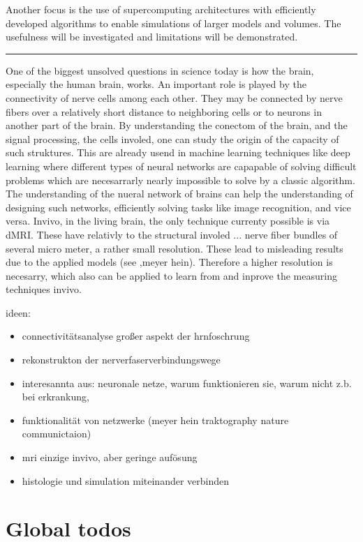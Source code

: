Another focus is the use of supercomputing architectures with efficiently developed algorithms to enable simulations of larger models and volumes.
The usefulness will be investigated and limitations will be demonstrated.
\par
% 
\par
\noindent\rule{\textwidth}{2pt}
\par
% 
One of the biggest unsolved questions in science today is how the brain, especially the human brain, works.
An important role is played by the connectivity of nerve cells among each other.
They may be connected by nerve fibers over a relatively short distance to neighboring cells or to neurons in another part of the brain.
By understanding the conectom of the brain, and the signal processing, \ie{} the cells involed, one can study the origin of the capacity of such struktures.
This are already usend in machine learning techniques like deep learning where different types of neural networks are capapable of solving difficult problems which are necesarrarly nearly impossible to solve by a classic algorithm.
The understanding of the nueral network of brains can help the understanding of designing such networks, \eg{} efficiently solving tasks like image recognition, and vice versa.
% 
Invivo, \ie{} in the living brain, the only technique currenty possible is via \ac{dMRI}.
These have relativly to the structural involed ... \ie{} nerve fiber bundles of several micro meter, a rather small resolution.
These lead to misleading results due to the applied models (see ,meyer hein).
Therefore a higher resolution is necesarry, which also can be applied to learn from and inprove the measuring techniques invivo.

%
ideen:
\begin{itemize}
   \item  connectivitätsanalyse großer aspekt der hrnfoschrung
   \item  rekonstrukton der nerverfaserverbindungswege
   \item  interesannta aus: neuronale netze, warum funktionieren sie, warum nicht z.b. bei erkrankung,
   \item  funktionalität von netzwerke (meyer hein traktography nature communictaion)
   \item  mri einzige invivo, aber geringe aufösung
   \item  histologie und simulation miteinander verbinden
\end{itemize}


\section{Global todos}
%
\cite{Angles2019}\\
\cite{Callaghan2019}\\
%
